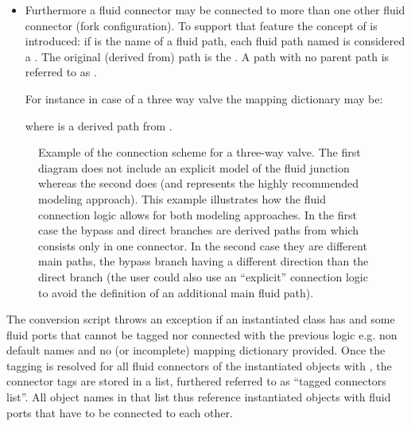 \documentclass[letterpaper,10pt, openany,english]{sphinxmanual}
\begin{document}
\begin{enumerate}
\begin{itemize}
\item {} 
Furthermore a fluid connector may be connected to more than one other fluid connector (fork configuration). To support that feature the concept of  is introduced: if  is the name of a fluid path, each fluid path named  is considered a . The original (derived from) path is the . A path with no parent path is referred to as .

For instance in case of a three way valve the mapping dictionary may be:

 where  is a derived path from .

\end{itemize}

\end{enumerate}

\begin{figure}[htbp]
\centering
\capstart

\noindent{}
\caption{Example of the connection scheme for a three-way valve. The first diagram does not include an explicit model of the fluid junction whereas the second does (and represents the highly recommended modeling approach). This example illustrates how the fluid connection logic allows for both modeling approaches. In the first case the bypass and direct branches are derived paths from  which consists only in one connector. In the second case they are different main paths, the bypass branch having a different direction than the direct branch (the user could also use an “explicit” connection logic to avoid the definition of an additional main fluid path).}\label{\detokenize{requirements:linkage-connect-3wv}}\end{figure}

The conversion script throws an exception if an instantiated class has  and some fluid ports that cannot be tagged nor connected with the previous logic e.g. non default names and no (or incomplete) mapping dictionary provided.
Once the tagging is resolved for all fluid connectors of the instantiated objects with , the connector tags are stored in a list, furthered referred to as “tagged connectors list”.
All object names in that list thus reference instantiated objects with fluid ports that have to be connected to each other.
\end{document}

